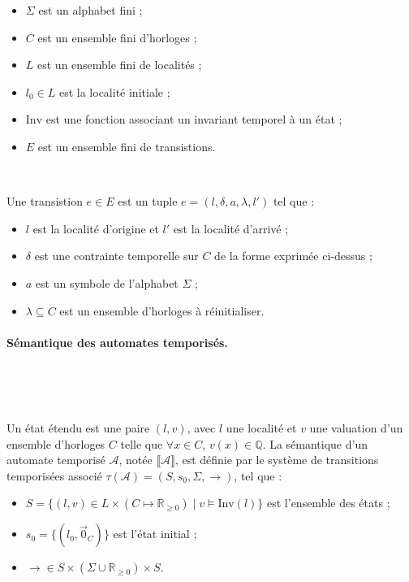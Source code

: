 \documentclass{article}
\begin{document}
        \begin{itemize}
          \item $\Sigma$ est un alphabet fini ;
          \item $C$ est un ensemble fini d'horloges ;
          \item $L$ est un ensemble fini de localités ;
          \item $l_0 \in L$ est la localité initiale ;
          \item $\mathrm{Inv}$ est une fonction associant un invariant temporel
            à un état ;
          \item $E$ est un ensemble fini de transistions.
        \end{itemize}
      
        ~

        \noindent
        Une transistion $e \in E$ est un tuple $e = (l, \delta, a, \lambda, l')$
        tel que :
      
        \begin{itemize}
          \item $l$ est la localité d'origine et $l'$ est la localité d'arrivé ;
          \item $\delta$ est une contrainte temporelle sur $C$ de la forme
            exprimée ci-dessus ;
          \item $a$ est un symbole de l'alphabet $\Sigma$ ;
          \item $\lambda \subseteq C$ est un ensemble d'horloges à
            réinitialiser.
        \end{itemize}

      \paragraph{Sémantique des automates temporisés.} ~

        ~
      
        Un état étendu est une paire $(l,v)$, avec $l$ une localité et $v$ une
        valuation d'un ensemble d'horloges $C$ telle que $\forall x \in C$,
        $v(x) \in \mathbb{Q}$. La sémantique d'un automate temporisé
        $\mathcal{A}$, notée $\llbracket\mathcal{A}\rrbracket$, est définie par
        le système de transitions temporisées associé $\tau(\mathcal{A}) = (S,
        s_0, \Sigma, \rightarrow)$, tel que :
        
        \begin{itemize}
          \item $S = \{(l,v) \in L \times (C \mapsto \mathbb{R}_{\geq 0}) \mid v
            \models \mathrm{Inv}(l)\}$ est l'ensemble des états ;
          \item $s_0 = \{(l_0,\vec{0}_C)\}$ est l'état initial ;
          \item $\rightarrow \in S\times (\Sigma \cup \mathbb{R}_{\geq 0})
            \times S$.
        \end{itemize}
        
\end{document}
